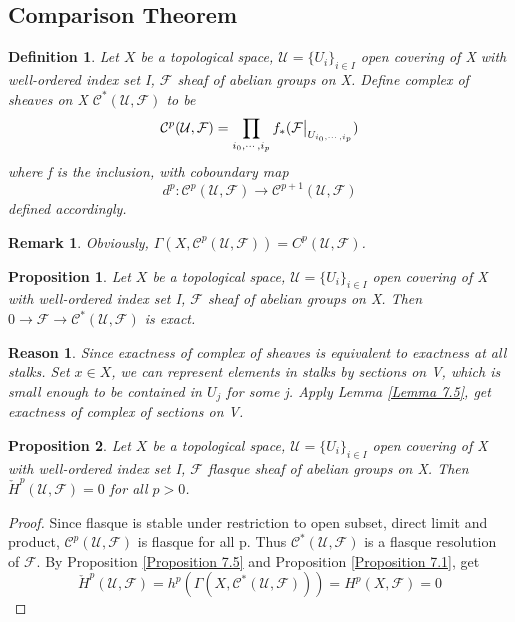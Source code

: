 \documentclass{ctexart}
\newtheorem{definition}{Definition}[section]
\newtheorem{remark}{Remark}[section]
\newtheorem{proposition}{Proposition}[section]
\newtheorem{reason}{Reason}[section]
\begin{document}
\subsection{Comparison Theorem}
\begin{definition}
    Let $X$ be a topological space, $\mathcal{U} = \{U_{i}\}_{i\in I}$ open covering of X with well-ordered index set I, $\mathcal{F}$ sheaf of abelian groups on X.
    Define complex of sheaves on X $\mathcal{C}^{\ast}(\mathcal{U}, \mathcal{F})$ to be
    \begin{equation*}
        \mathcal{C}^{p}(\mathcal{U}, \mathcal{F}) = \prod_{i_{0}, \cdots, i_{p}} f_{\ast}(\mathcal{F}\big{|}_{U_{i_{0}, \cdots, i_{p}}})
    \end{equation*}
    where f is the inclusion, with coboundary map
    \begin{equation*}
        d^{p}: \mathcal{C}^{p}(\mathcal{U}, \mathcal{F}) \longrightarrow \mathcal{C}^{p + 1}(\mathcal{U}, \mathcal{F})
    \end{equation*}
    defined accordingly.
\end{definition}
\begin{remark}
    Obviously, $\Gamma(X, \mathcal{C}^{p}(\mathcal{U}, \mathcal{F})) = C^{p}(\mathcal{U}, \mathcal{F})$.
\end{remark}
\begin{proposition}
    Let $X$ be a topological space, $\mathcal{U} = \{U_{i}\}_{i\in I}$ open covering of X with well-ordered index set I, $\mathcal{F}$ sheaf of abelian groups on X.
    Then $0 \longrightarrow \mathcal{F} \longrightarrow \mathcal{C}^{\ast}(\mathcal{U}, \mathcal{F})$ is exact.
    \label{Proposition 7.7}
\end{proposition}
\begin{reason}
    Since exactness of complex of sheaves is equivalent to exactness at all stalks.
    Set $x\in X$, we can represent elements in stalks by sections on V, which is small enough to be contained in $U_{j}$ for some j.
    Apply Lemma \ref{Lemma 7.5}, get exactness of complex of sections on V.
\end{reason}
\begin{proposition}
    Let $X$ be a topological space, $\mathcal{U} = \{U_{i}\}_{i\in I}$ open covering of X with well-ordered index set I, $\mathcal{F}$ flasque sheaf of abelian groups on X.
    Then $\check{H}^{p}(\mathcal{U}, \mathcal{F}) = 0$ for all $p > 0$.
    \label{Proposition 7.8}
\end{proposition}
\begin{proof}
    Since flasque is stable under restriction to open subset, direct limit and product, $\mathcal{C}^{p}(\mathcal{U}, \mathcal{F})$ is flasque for all p.
    Thus $\mathcal{C}^{\ast}(\mathcal{U}, \mathcal{F})$ is a flasque resolution of $\mathcal{F}$.
    By Proposition \ref{Proposition 7.5} and Proposition \ref{Proposition 7.1}, get
    \begin{equation*}
        \check{H}^{p}(\mathcal{U}, \mathcal{F}) = h^{p}(\Gamma(X, \mathcal{C}^{\ast}(\mathcal{U}, \mathcal{F}))) = H^{p}(X, \mathcal{F}) = 0
    \end{equation*}
\end{proof}
\end{document}
